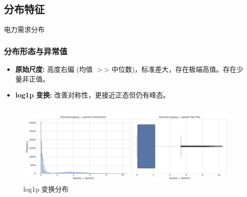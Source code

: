 \documentclass{beamer} %
\begin{document}
\subsection{分布特征} %
\begin{frame}{电力需求分布}
    \frametitle{分布形态与异常值}
    \begin{itemize}
        \item \textbf{原始尺度:} 高度右偏 (均值 \(>\)> 中位数)，标准差大，存在极端高值。存在少量非正值。
        \item \textbf{log1p 变换:} 改善对称性，更接近正态但仍有峰态。
    \end{itemize}
    \begin{columns}
        \begin{column}{0.48\textwidth}
            \centering
            \begin{figure}
                \includegraphics[width=\textwidth]{../plots/demand_y_distribution_log1p_scale.png}
                \caption{log1p 变换分布}
            \end{figure}
        \end{column}
    \end{columns}
\end{frame}
\end{document}
